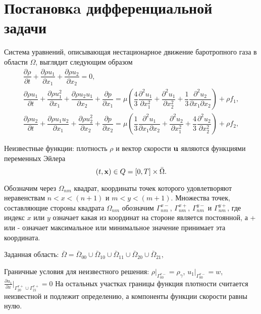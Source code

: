 \documentclass[a4paper,11pt]{article}
\begin{document}
\section{Постановкa дифференциальной задачи}
Система уравнений, описывающая нестационарное движение баротропного газа
в области $\Omega$,
выглядит следующим образом
\begin{equation}
\begin{array}{l}
\dfrac{\partial \rho}{\partial t}+\dfrac{\partial \rho u_1}{\partial x_1}+
\dfrac{\partial \rho u_2}{\partial x_2}= 0, \\[2.0ex]
\dfrac{\partial \rho u_1}{\partial t}
+\dfrac{\partial \rho u_1^2}{\partial x_1}+
\dfrac{\partial \rho u_2 u_1}{\partial x_2}+
\dfrac{\partial p}{\partial x_1}
=\mu\left(
\dfrac{4}{3}\dfrac{\partial^2 u_1}{\partial x_1^2}+
\dfrac{\partial^2 u_1}{\partial x_2^2}+
\dfrac{1}{3}\dfrac{\partial^2 u_2}{\partial x_1\partial x_2}\right)
+\rho f_1, \\[2.0ex]
\dfrac{\partial \rho u_2}{\partial t}
+\dfrac{\partial \rho u_1 u_2}{\partial x_1}+
\dfrac{\partial \rho u_2^2}{\partial x_2}+
\dfrac{\partial p}{\partial x_2}
=\mu\left(
\dfrac{1}{3}\dfrac{\partial^2 u_1}{\partial x_1\partial x_2}+
\dfrac{\partial^2 u_2}{\partial x_1^2}+
\dfrac{4}{3}\dfrac{\partial^2 u_2}{\partial x_2^2}\right)
+\rho f_2,
\end{array}
\label{dif.1}
\end{equation}

Неизвестные функции: плотность $\rho$  и вектор скорости ${\bf u}$ являются
функциями переменных Эйлера
$$
(t,{\bf x}) \in Q=[0,T]\times\bar\Omega.
$$%

Обозначим через $\Omega_{nm}$ квадрат, координаты точек которого удовлетворяют
неравенствам $n < x < (n+1)$ и $m < y < (m+1)$. Множества точек,
составляющие стороны квадрата $\Omega_{nm}$ обозначим $\Gamma_{nm}^{x-}$,
$\Gamma_{nm}^{x+}$, $\Gamma_{nm}^{y-}$ и $\Gamma_{nm}^{y+}$,
где индекс $x$ или $y$ означает какая из координат на стороне
является постоянной,
а + или - означает максимальное или минимальное значение
принимает эта координата.

Заданная область: $\bar\Omega=\bar\Omega_{00}\cup\bar\Omega_{10}\cup
\bar\Omega_{11}\cup\bar\Omega_{20}\cup\bar\Omega_{21}$,

Граничные условия для неизвестного решения: $\rho\vert_{\Gamma_{00}^{x-}}=\rho_{\gamma}$, $u_1\vert_{\Gamma_{00}^{x-}}=w$,
$\frac{\partial u_1}{\partial x}\vert_{\Gamma_{20}^{x+}\cup\Gamma_{21}^{x+}}=0$
На остальных участках границы
функция плотности считается неизвестной и подлежит определению, а компоненты функции скорости равны нулю.
\end{document}

